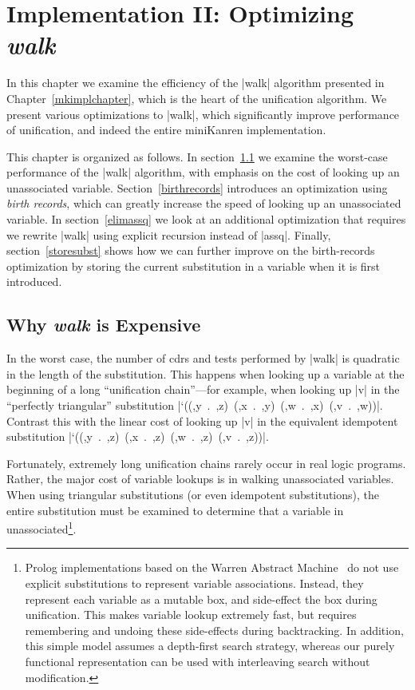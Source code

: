 \chapter{Implementation II:  Optimizing {\em walk}}\label{walkimpl}

In this chapter we examine the efficiency of the \mbox{\scheme|walk|}
algorithm presented in Chapter~\ref{mkimplchapter}, which is the heart
of the unification algorithm.  We present various optimizations to
\mbox{\scheme|walk|}, which significantly improve performance of
unification, and indeed the entire miniKanren implementation.

This chapter is organized as follows.  In section~\ref{walkexpensive}
we examine the worst-case performance of the \mbox{\scheme|walk|}
algorithm, with emphasis on the cost of looking up an unassociated
variable.  Section~\ref{birthrecords} introduces an optimization using
\emph{birth records}, which can greatly increase the speed of looking
up an unassociated variable.  In section~\ref{elimassq} we look at an
additional optimization that requires we rewrite \mbox{\scheme|walk|}
using explicit recursion instead of \mbox{\scheme|assq|}.  Finally,
section~\ref{storesubst} shows how we can further improve on the
birth-records optimization by storing the current substitution in a
variable when it is first introduced.

\section{Why {\em walk} is Expensive}\label{walkexpensive}
In the worst case, the number of cdrs and tests
performed by \mbox{\scheme|walk|} is quadratic in the length of the
substitution.  This happens when looking up a variable at the
beginning of a long ``unification chain''---for example, when looking
up \mbox{\scheme|v|} in the ``perfectly triangular'' substitution
\mbox{\scheme|`((,y . ,z) (,x . ,y) (,w . ,x) (,v . ,w))|}.  Contrast
this with the linear cost of looking up \mbox{\scheme|v|} in the
equivalent idempotent substitution 
\mbox{\scheme|`((,y . ,z) (,x . ,z) (,w . ,z) (,v . ,z))|}.

Fortunately, extremely long unification chains rarely occur in real
logic programs.  Rather, the major cost of variable lookups is in
walking unassociated variables.  When using triangular substitutions
(or even idempotent substitutions), the entire substitution must be
examined to determine that a variable in unassociated\footnote{Prolog
  implementations based on the Warren Abstract Machine~\cite{wamtutorial} do
  not use explicit substitutions to represent variable associations.
  Instead, they represent each variable as a mutable box, and
  side-effect the box during unification.  This makes variable lookup
  extremely fast, but requires remembering and undoing these
  side-effects during backtracking.  In addition, this simple model
  assumes a depth-first search strategy, whereas our purely functional
  representation can be used with interleaving search without
  modification.}.

